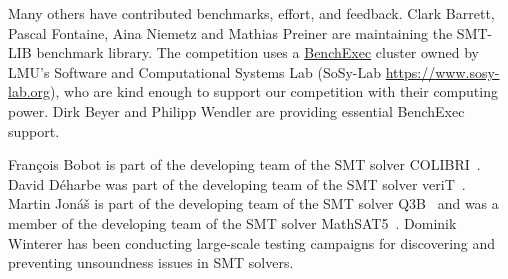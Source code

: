 \documentclass[12pt]{article}
\begin{document}
Many others have contributed benchmarks, effort, and feedback.  Clark Barrett,
Pascal Fontaine, Aina Niemetz and Mathias Preiner are maintaining the SMT-LIB
benchmark library.
The competition uses a \href{https://github.com/sosy-lab/benchexec}{BenchExec} cluster
owned by LMU's Software and Computational Systems Lab (SoSy-Lab \url{https://www.sosy-lab.org}),
who are kind enough to support our competition with their computing power. Dirk
Beyer and Philipp Wendler are providing essential BenchExec support.

Fran\c{c}ois Bobot is part of the developing team of the SMT solver COLIBRI~\cite{colibri}.
%
David D\'{e}harbe was part of the developing team of the SMT solver veriT~\cite{verit}.
%
Martin Jon\'{a}\v{s} is part of the developing team of the SMT solver Q3B~\cite{Q3B} and was a member of the developing team of the SMT solver MathSAT5~\cite{MathSAT5}. Dominik Winterer has been conducting large-scale testing campaigns for discovering and preventing unsoundness issues in SMT solvers. 


\pagebreak



\end{document}
